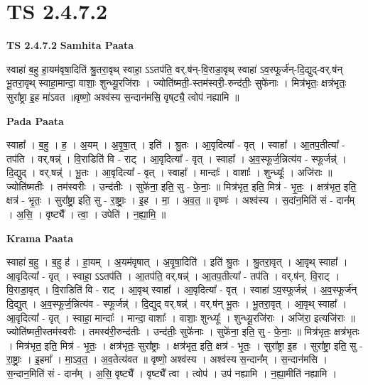 \documentclass[17pt]{extarticle}
\begin{document}
\section*{ TS 2.4.7.2 }

\textbf{TS 2.4.7.2 } \newline
\textbf{Samhita Paata} \newline

स्वाहा॑ ब॒हु हा॒यम॑वृषा॒दिति॑ श्रु॒तरा॒वृथ् स्वाहा॒ ऽऽतप॑ति॒ वर्.ष॑न्-वि॒राडा॒वृथ् स्वाहा॑ ऽव॒स्फूर्ज॑न्-दि॒द्युद्-वर्.ष॑न् भू॒तरा॒वृथ् स्वाहा॒मान्दा॒ वाशाः॒ शुन्ध्यू॒रजि॑राः । ज्योति॑ष्मती॒-स्तम॑स्वरी॒-रुन्द॑तीः॒ सुफे॑नाः । मित्र॑भृतः॒ क्षत्र॑भृतः॒ सुरा᳚ष्ट्रा इ॒ह मा॑ऽवत ॥वृष्णो॒ अश्व॑स्य स॒न्दान॑मसि॒ वृष्‌ट्यै॒ त्वोप॑ नह्यामि ॥ \newline

\textbf{Pada Paata} \newline

स्वाहा᳚ । ब॒हु । ह॒ । अ॒यम् । अ॒वृ॒षा॒त् । इति॑ । श्रु॒तः । आ॒वृदित्या᳚ - वृत् । स्वाहा᳚ । आ॒तप॒तीत्या᳚ - तप॑ति । वर्.षन्न्॑ । वि॒राडिति॑ वि - राट् । आ॒वृदित्या᳚ - वृत् । स्वाहा᳚ । अ॒व॒स्फूर्ज॒न्नित्य॑व - स्फूर्जन्न्॑ । दि॒द्युद् । वर्.षन्न्॑ । भू॒तः । आ॒वृदित्या᳚ - वृत् । स्वाहा᳚ । मान्दाः᳚ । वाशाः᳚ । शुन्ध्यूः᳚ । अजि॑राः ॥ ज्योति॑ष्मतीः । तम॑स्वरीः । उन्द॑तीः । सुफे॑ना॒ इति॒ सु - फे॒नाः॒ ॥ मित्र॑भृत॒ इति॒ मित्र॑ - भृ॒तः॒ । क्षत्र॑भृत॒ इति॒ क्षत्र॑ - भृ॒तः॒ । सुरा᳚ष्ट्रा॒ इति॒ सु - रा॒ष्ट्राः॒ । इ॒ह । मा॒ । अ॒व॒त॒ ॥ वृष्णः॑ । अश्व॑स्य । स॒दांन॒मिति॑ सं - दान᳚म् । अ॒सि॒ । वृष्ट्यै᳚ । त्वा॒ । उपेति॑ । न॒ह्या॒मि॒ ॥  \newline


\textbf{Krama Paata} \newline

स्वाहा॑ ब॒हु । ब॒हु ह॑ । हा॒यम् । अ॒यम॑वृषात् । अ॒वृ॒षा॒दिति॑ । इति॑ श्रु॒तः । श्रु॒तरा॒वृत् । आ॒वृथ् स्वाहा᳚ । आ॒वृदित्या᳚ - वृत् । स्वाहा॒ ऽऽतप॑ति । आ॒तप॑ति॒ वर्.षन्न्॑ । आ॒तप॒तीत्या᳚ - तप॑ति । वर्.ष॑न्. वि॒राट् । वि॒राडा॒वृत् । वि॒राडिति॑ वि - राट् । आ॒वृथ् स्वाहा᳚ । आ॒वृदित्या᳚ - वृत् । स्वाहा॑ ऽव॒स्फूर्जन्न्॑ । अ॒व॒स्फूर्ज॑न् दि॒द्युत् । अ॒व॒स्फूर्ज॒न्नित्य॑व - स्फूर्जन्न्॑ । दि॒द्युद् वर्.षन्न्॑ । वर्.ष॑न् भू॒तः । भू॒तरा॒वृत् । 
आ॒वृथ् स्वाहा᳚ । आ॒वृदित्या᳚ - वृत् । स्वाहा॒ मान्दाः᳚ । मान्दा॒ वाशाः᳚ । वाशाः॒ शुन्ध्यूः᳚ । शुन्ध्यू॒रजि॑राः । अजि॑रा॒ इत्यजि॑राः ॥ ज्योति॑ष्मती॒स्तम॑स्वरीः । तमस्व॑री॒रुन्द॑तीः । उन्द॑तीः॒ सुफे॑नाः । सुफे॑ना॒ इति॒ सु - फे॒नाः॒ ॥ मित्र॑भृतः॒ क्षत्र॑भृतः । मित्र॑भृत॒ इति॒ मित्र॑ - भृ॒तः॒ । क्षत्र॑भृतः॒ सुरा᳚ष्ट्राः । क्षत्र॑भृत॒ इति॒ क्षत्र॑ - भृ॒तः॒ । सुरा᳚ष्ट्रा इ॒ह । सुरा᳚ष्ट्रा॒ इति॒ सु - रा॒ष्ट्राः॒ । इ॒हमा᳚ । मा॒ऽव॒त॒ । अ॒व॒तेत्य॑वत ॥ वृष्णो॒ अश्व॑स्य । अश्व॑स्य स॒न्दान᳚म् । स॒न्दान॑मसि । स॒न्दान॒मिति॑ सं - दान᳚म् । अ॒सि॒ वृष्ट्यै᳚ । वृष्ट्यै᳚ त्वा । त्वोप॑ । उप॑ नह्यामि । 
न॒ह्या॒मीति॑ नह्यामि । \newline
\end{document}
